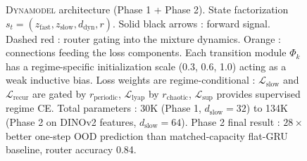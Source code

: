 \begin{figure}[ht]
\caption{\textsc{Dynamodel} architecture (Phase 1 + Phase 2). State factorization $s_t = (z_{\text{fast}}, z_{\text{slow}}, d_{\text{dyn}}, r)$. Solid black arrows : forward signal. Dashed red : router gating into the mixture dynamics. Orange : connections feeding the loss components. Each transition module $\Phi_k$ has a regime-specific initialization scale (0.3, 0.6, 1.0) acting as a weak inductive bias. Loss weights are regime-conditional : $\mathcal{L}_{\text{slow}}$ and $\mathcal{L}_{\text{recur}}$ are gated by $r_{\text{periodic}}$, $\mathcal{L}_{\text{lyap}}$ by $r_{\text{chaotic}}$, $\mathcal{L}_{\text{sup}}$ provides supervised regime CE. Total parameters : 30K (Phase 1, $d_{\text{slow}}{=}32$) to 134K (Phase 2 on DINOv2 features, $d_{\text{slow}}{=}64$). Phase 2 final result : $28\times$ better one-step OOD prediction than matched-capacity flat-GRU baseline, router accuracy 0.84.}
\label{fig:dynamodel}
\end{figure}
